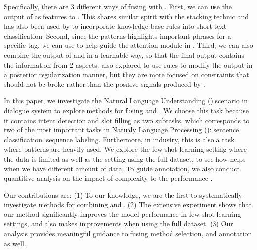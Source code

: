 Specifically, there are 3 different ways of fusing \RE with \NN. First, we can use the output of \RE as features to \NN. This shares similar spirit with the stacking technic \cite{wolpert1992stacked} and has also been used by \cite{wangcombining17} to incorporate knowledge base rules into short text classification. Second, since the \RE patterns highlights important phrases for a specific tag, we can use \RE to help guide the attention module in \NN. Third, we can also combine the output of \RE and \NN in a learnable way, so that the final output contains the information from 2 aspects. \cite{hu2016deep} also explored to use rules to modify the \NN output in a posterior regularization manner, but they are more focused on constraints that should not be broke rather than the positive signals produced by \RE.

In this paper, we investigate the Natural Language Understanding (\NLU) scenario in dialogue system to explore methods for fusing \RE and \NN. We choose this task because it contains intent detection and slot filling as two subtasks, which corresponds to two of the most important tasks in Natualy Language Processing (\NLP): sentence classification, sequence labeling. 
Furthermore, in industry, this is also a task where \RE patterns are heavily used.
We explore the few-shot learning setting where the data is limited as well as the setting using the full dataset, to see how \RE helps when we have different amount of data. To guide \RE annotation, we also conduct quantitive analysis on the impact of \RE complexity to the performance \NN. 

Our contributions are: (1) To our knowledge, we are the first to systematically investigate methods for combining \RE and \NN. (2) The extensive experiment shows that our method significantly improves the model performance in few-shot learning settings, and also makes improvements when using the full dataset. (3) Our analysis provides meaningful guidance to fusing method selection, and \RE annotation as well.

